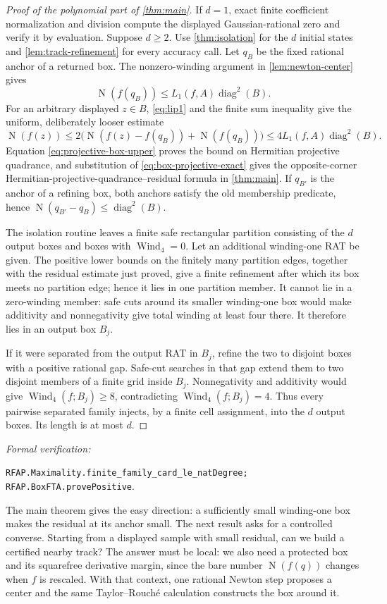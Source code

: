 \documentclass[11pt]{article}
\newcommand{\Norm}[1]{\operatorname{N}\!\left(#1\right)}
\newcommand{\Wind}{\operatorname{Wind}}
\newcommand{\diamq}{\operatorname{diag}^{2}}
\newcommand{\leanref}[1]{\par\smallskip\noindent
  \emph{Formal verification:}\par\nobreak
  {\raggedright\nolinkurl{#1}.\par}}
\begin{document}
\begin{proof}[Proof of the polynomial part of \cref{thm:main}]
If $d=1$, exact finite coefficient normalization and division compute the
displayed Gaussian-rational zero and verify it by evaluation.  Suppose
$d\ge2$.  Use \cref{thm:isolation} for the $d$ initial states and
\cref{lem:track-refinement} for every accuracy call.  Let $q_B$ be the fixed
rational anchor of a returned box.  The nonzero-winding argument in
\cref{lem:newton-center} gives
\[
 \Norm{f(q_B)}\le L_1(f,A)\diamq(B).
\]
For an arbitrary displayed $z\in B$, \cref{eq:lip1} and the finite sum
inequality give the uniform, deliberately looser estimate
\[
 \Norm{f(z)}
 \le2\bigl(\Norm{f(z)-f(q_B)}+\Norm{f(q_B)}\bigr)
 \le4L_1(f,A)\diamq(B).
\]
Equation \eqref{eq:projective-box-upper} proves the bound on Hermitian
projective quadrance, and substitution of \eqref{eq:box-projective-exact} gives
the opposite-corner Hermitian-projective-quadrance--residual formula in
\cref{thm:main}.  If $q_{B'}$ is the anchor of a
refining box, both anchors satisfy the old membership predicate, hence
$\Norm{q_{B'}-q_B}\le\diamq(B)$.

The isolation routine leaves a finite safe rectangular partition consisting
of the $d$ output boxes and boxes with $\Wind_4=0$.  Let an additional
winding-one RAT be given.  The positive lower bounds on the finitely many
partition edges, together with the residual estimate just proved, give a
finite refinement after which its box meets no partition edge; hence it lies
in one partition member.  It cannot lie in a zero-winding member: safe cuts
around its smaller winding-one box would make additivity and nonnegativity
give total winding at least four there.  It therefore lies
in an output box $B_j$.

If it were separated from the output RAT in $B_j$, refine the two to disjoint
boxes with a positive rational gap.  Safe-cut searches in that gap extend
them to two disjoint members of a finite grid inside $B_j$.  Nonnegativity
and additivity would give $\Wind_4(f;B_j)\ge8$, contradicting
$\Wind_4(f;B_j)=4$.  Thus every pairwise separated family injects, by a
finite cell assignment, into the $d$ output boxes.  Its length is at most
$d$.
\end{proof}

\leanref{RFAP.Maximality.finite_family_card_le_natDegree;
RFAP.BoxFTA.provePositive}

The main theorem gives the easy direction: a sufficiently small
winding-one box makes the residual at its anchor small.  The next result asks
for a controlled converse.  Starting from a displayed sample with small
residual, can we build a certified nearby track?  The answer must be local:
we also need a protected box and its squarefree derivative margin, since the
bare number $\Norm{f(q)}$ changes when $f$ is rescaled.  With that context,
one rational Newton step proposes a center and the same Taylor--Rouch\'e
calculation constructs the box around it.
\end{document}

